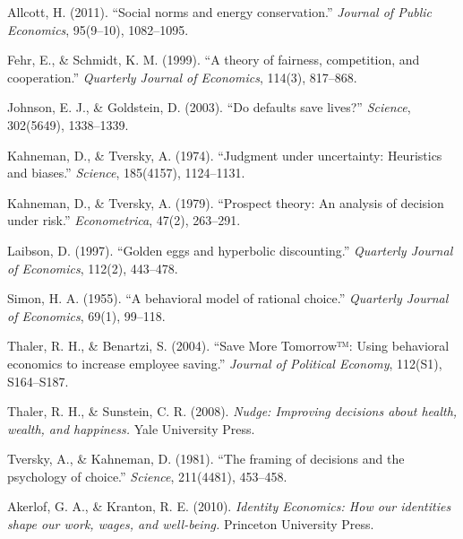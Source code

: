 \documentclass[11pt]{book}
\begin{document}
\begin{thebibliography}{}

Allcott, H. (2011). ``Social norms and energy conservation.'' \textit{Journal of Public Economics}, 95(9–10), 1082–1095.

Fehr, E., \& Schmidt, K. M. (1999). ``A theory of fairness, competition, and cooperation.'' \textit{Quarterly Journal of Economics}, 114(3), 817–868.

Johnson, E. J., \& Goldstein, D. (2003). ``Do defaults save lives?'' \textit{Science}, 302(5649), 1338–1339.

Kahneman, D., \& Tversky, A. (1974). ``Judgment under uncertainty: Heuristics and biases.'' \textit{Science}, 185(4157), 1124–1131.

Kahneman, D., \& Tversky, A. (1979). ``Prospect theory: An analysis of decision under risk.'' \textit{Econometrica}, 47(2), 263–291.

Laibson, D. (1997). ``Golden eggs and hyperbolic discounting.'' \textit{Quarterly Journal of Economics}, 112(2), 443–478.

Simon, H. A. (1955). ``A behavioral model of rational choice.'' \textit{Quarterly Journal of Economics}, 69(1), 99–118.

Thaler, R. H., \& Benartzi, S. (2004). ``Save More Tomorrow™: Using behavioral economics to increase employee saving.'' \textit{Journal of Political Economy}, 112(S1), S164–S187.

Thaler, R. H., \& Sunstein, C. R. (2008). \textit{Nudge: Improving decisions about health, wealth, and happiness.} Yale University Press.

Tversky, A., \& Kahneman, D. (1981). ``The framing of decisions and the psychology of choice.'' \textit{Science}, 211(4481), 453–458.

Akerlof, G. A., \& Kranton, R. E. (2010). \textit{Identity Economics: How our identities shape our work, wages, and well-being.} Princeton University Press.

\end{thebibliography}
\endgroup
\end{document}
